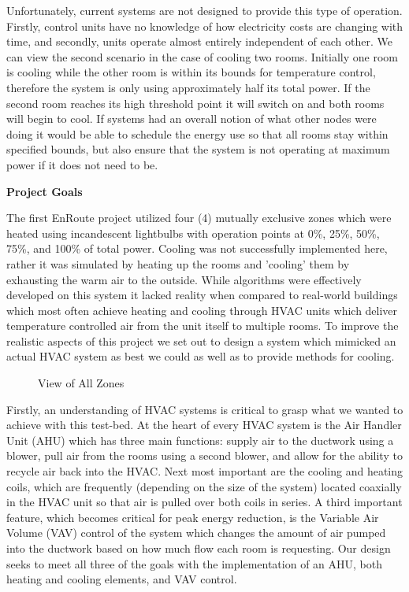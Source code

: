 \documentclass[a4paper,10pt,twocolumn]{article}
\begin{document}
Unfortunately, current systems are not designed to provide this type of operation.  Firstly, control units have no knowledge of how electricity costs are changing with time, and secondly, units operate almost entirely independent of each other.  We can view the second scenario in the case of cooling two rooms.  Initially one room is cooling while the other room is within its bounds for temperature control, therefore the system is only using approximately half its total power.  If the second room reaches its high threshold point it will switch on and both rooms will begin to cool.  If systems had an overall notion of what other nodes were doing it would be able to schedule the energy use so that all rooms stay within specified bounds, but also ensure that the system is not operating at maximum power if it does not need to be.

\begin{center}
{\bf Project Goals}
\end{center}

The first EnRoute project utilized four (4) mutually exclusive zones which were heated using incandescent lightbulbs with operation points at 0\%, 25\%, 50\%, 75\%, and 100\% of total power.  Cooling was not successfully implemented here, rather it was simulated by heating up the rooms and 'cooling' them by exhausting the warm air to the outside.  While algorithms were effectively developed on this system it lacked reality when compared to real-world buildings which most often achieve heating and cooling through HVAC units which deliver temperature controlled air from the unit itself to multiple rooms.  To improve the realistic aspects of this project we set out to design a system which mimicked an actual HVAC system as best we could as well as to provide methods for cooling.

\begin{figure}[t]
\centering
{}
\caption{View of All Zones}
\label{front}
\end{figure}

Firstly, an understanding of HVAC systems is critical to grasp what we wanted to achieve with this test-bed.  At the heart of every HVAC system is the Air Handler Unit (AHU) which has three main functions:  supply air to the ductwork using a blower, pull air from the rooms using a second blower, and allow for the ability to recycle air back into the HVAC.  Next most important are the cooling and heating coils, which are frequently (depending on the size of the system) located coaxially in the HVAC unit so that air is pulled over both coils in series.  A third important feature, which becomes critical for peak energy reduction, is the Variable Air Volume (VAV) control of the system which changes the amount of air pumped into the ductwork based on how much flow each room is requesting.  Our design seeks to meet all three of the goals with the implementation of an AHU, both heating and cooling elements, and VAV control.
\end{document}
